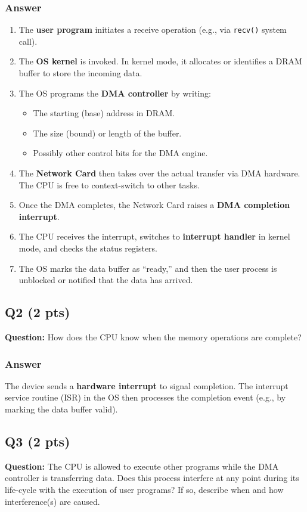 \documentclass[12pt]{article}
\begin{document}
	\subsubsection*{Answer}
	\begin{enumerate}
		\item The \textbf{user program} initiates a receive operation (e.g., via \texttt{recv()} system call).
		\item The \textbf{OS kernel} is invoked. In kernel mode, it allocates or identifies a DRAM buffer to store the incoming data.
		\item The OS programs the \textbf{DMA controller} by writing:
		\begin{itemize}
			\item The starting (base) address in DRAM.
			\item The size (bound) or length of the buffer.
			\item Possibly other control bits for the DMA engine.
		\end{itemize}
		\item The \textbf{Network Card} then takes over the actual transfer via DMA hardware. The CPU is free to context-switch to other tasks.
		\item Once the DMA completes, the Network Card raises a \textbf{DMA completion interrupt}.
		\item The CPU receives the interrupt, switches to \textbf{interrupt handler} in kernel mode, and checks the status registers.
		\item The OS marks the data buffer as “ready,” and then the user process is unblocked or notified that the data has arrived.
	\end{enumerate}
	
	\subsection*{Q2 (2 pts)}
	\textbf{Question:} How does the CPU know when the memory operations are complete?
	
	\subsubsection*{Answer}
	The device sends a \textbf{hardware interrupt} to signal completion. The interrupt service routine (ISR) in the OS then processes the completion event (e.g., by marking the data buffer valid).
	
	\subsection*{Q3 (2 pts)}
	\textbf{Question:} The CPU is allowed to execute other programs while the DMA controller is transferring data. Does this process interfere at any point during its life-cycle with the execution of user programs? If so, describe when and how interference(s) are caused.
	
\end{document}
